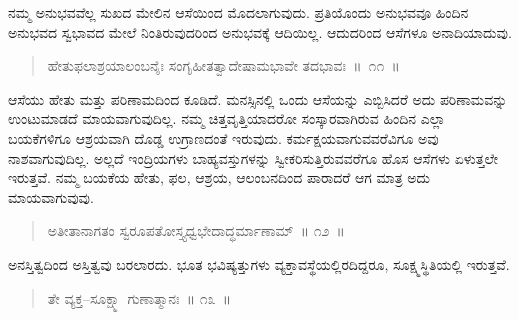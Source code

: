 
\vspace{0.1cm}

ನಮ್ಮ ಅನುಭವವೆಲ್ಲ ಸುಖದ ಮೇಲಿನ ಆಸೆಯಿಂದ ಮೊದಲಾಗುವುದು. ಪ್ರತಿಯೊಂದು ಅನುಭವವೂ ಹಿಂದಿನ ಅನುಭವದ ಸ್ವಭಾವದ ಮೇಲೆ ನಿಂತಿರುವುದರಿಂದ ಅನುಭವಕ್ಕೆ ಆದಿಯಿಲ್ಲ. ಆದುದರಿಂದ ಆಸೆಗಳೂ ಅನಾದಿಯಾದುವು. 

\vspace{-0.17cm}

\begin{verse}
ಹೇತುಫಲಾಶ್ರಯಾಲಂಬನೈಃ ಸಂಗೃಹೀತತ್ವಾದೇಷಾಮಭಾವೇ ತದಭಾವಃ~॥~೧೧~॥
\end{verse}

\vspace{-0.35cm}


\vspace{0.1cm}

ಆಸೆಯು ಹೇತು ಮತ್ತು ಪರಿಣಾಮದಿಂದ ಕೂಡಿದೆ. ಮನಸ್ಸಿನಲ್ಲಿ ಒಂದು ಆಸೆಯನ್ನು ಎಬ್ಬಿಸಿದರೆ ಅದು ಪರಿಣಾಮವನ್ನು ಉಂಟುಮಾಡದೆ ಮಾಯವಾಗುವುದಿಲ್ಲ. ನಮ್ಮ ಚಿತ್ತವೃತ್ತಿಯಾದರೋ ಸಂಸ್ಕಾರವಾಗಿರುವ ಹಿಂದಿನ ಎಲ್ಲಾ ಬಯಕೆಗಳಿಗೂ ಆಶ್ರಯವಾಗಿ ದೊಡ್ಡ ಉಗ್ರಾಣದಂತೆ ಇರುವುದು. ಕರ್ಮಕ್ಷಯವಾಗುವವರೆವಿಗೂ ಅವು ನಾಶವಾಗುವುದಿಲ್ಲ. ಅಲ್ಲದೆ ಇಂದ್ರಿಯಗಳು ಬಾಹ್ಯವಸ್ತುಗಳನ್ನು ಸ್ವೀಕರಿಸುತ್ತಿರುವವರೆಗೂ ಹೊಸ ಆಸೆಗಳು ಏಳುತ್ತಲೇ ಇರುತ್ತವೆ. ನಮ್ಮ ಬಯಕೆಯ ಹೇತು, ಫಲ, ಆಶ್ರಯ, ಆಲಂಬನದಿಂದ ಪಾರಾದರೆ ಆಗ ಮಾತ್ರ ಅದು ಮಾಯವಾಗುವುವು. 

\vspace{-0.2cm}

\begin{verse}
ಅತೀತಾನಾಗತಂ ಸ್ವರೂಪತೋಸ್ತ್ಯಧ್ವಭೇದಾದ್ಧರ್ಮಾಣಾಮ್​~॥ ೧೨~॥
\end{verse}

\vspace{-0.35cm}


\vspace{0.1cm}

ಅನಸ್ತಿತ್ವದಿಂದ ಅಸ್ತಿತ್ವವು ಬರಲಾರದು. ಭೂತ ಭವಿಷ್ಯತ್ತುಗಳು ವ್ಯಕ್ತಾವಸ್ಥೆಯಲ್ಲಿರ\-ದಿದ್ದರೂ, ಸೂಕ್ಷ್ಮಸ್ಥಿತಿಯಲ್ಲಿ ಇರುತ್ತವೆ. 

\vspace{-0.15cm}

\begin{verse}
ತೇ ವ್ಯಕ್ತ–ಸೂಕ್ಷ್ಮಾ ಗುಣಾತ್ಮಾನಃ~॥ ೧೩~॥
\end{verse}

\vspace{-0.3cm}

